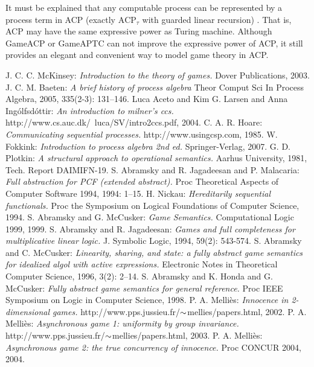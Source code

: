 \documentclass{fac}
\begin{document}
It must be explained that any computable process can be represented by a process term in ACP (exactly $\textrm{ACP}_\tau$ with guarded linear recursion) \cite{Consistency}. That is, ACP may have the same
expressive power as Turing machine. Although GameACP or GameAPTC can not improve the expressive power of ACP, it still provides an elegant and convenient way to model game theory in ACP.

\begin{thebibliography}{Lam94}
   J. C. C. McKinsey: \emph{Introduction to the theory of games.} Dover Publications, 2003.
   J. C. M. Baeten: \emph{A brief history of process algebra} Theor Comput Sci In Process Algebra, 2005, 335(2-3): 131--146.
   Luca Aceto and Kim G. Larsen and Anna Ing\'{o}lfsd\'{o}ttir: \emph{An introduction to milner's ccs.} http://www.cs.auc.dk/~luca/SV/intro2ccs.pdf, 2004.
   C. A. R. Hoare: \emph{Communicating sequential processes.} http://www.usingcsp.com, 1985.
   W. Fokkink: \emph{Introduction to process algebra 2nd ed.} Springer-Verlag, 2007.
   G. D. Plotkin: \emph{A structural approach to operational semantics.} Aarhus University, 1981, Tech. Report DAIMIFN-19.
   S. Abramsky and R. Jagadeesan and P. Malacaria: \emph{Full abstraction for PCF (extended abstract).} Proc Theoretical Aspects of Computer Software 1994, 1994: 1--15.
   H. Nickau: \emph{Hereditarily sequential functionals.} Proc the Symposium on Logical Foundations of Computer Science, 1994.
   S. Abramsky and G. McCusker: \emph{Game Semantics.} Computational Logic 1999, 1999.
   S. Abramsky and R. Jagadeesan: \emph{Games and full completeness for multiplicative linear logic.} J. Symbolic Logic, 1994, 59(2): 543-574.
   S. Abramsky and C. McCusker: \emph{Linearity, sharing, and state: a fully abstract game semantics for idealized algol with active expressions.} Electronic Notes in Theoretical Computer Science, 1996, 3(2): 2--14.
   S. Abramsky and K. Honda and G. McCusker: \emph{Fully abstract game semantics for general reference.} Proc IEEE Symposium on Logic in Computer Science, 1998.
   P. A. Melli\`{e}s: \emph{Innocence in 2-dimensional games.} http://www.pps.jussieu.fr/$\scriptsize{\sim}$mellies/papers.html, 2002.
   P. A. Melli\`{e}s: \emph{Asynchronous game 1: uniformity by group invariance.} http://www.pps.jussieu.fr/$\scriptsize{\sim}$mellies/papers.html, 2003.
   P. A. Melli\`{e}s: \emph{Asynchronous game 2: the true concurrency of innocence.} Proc CONCUR 2004, 2004.

\end{thebibliography}
\end{document}
